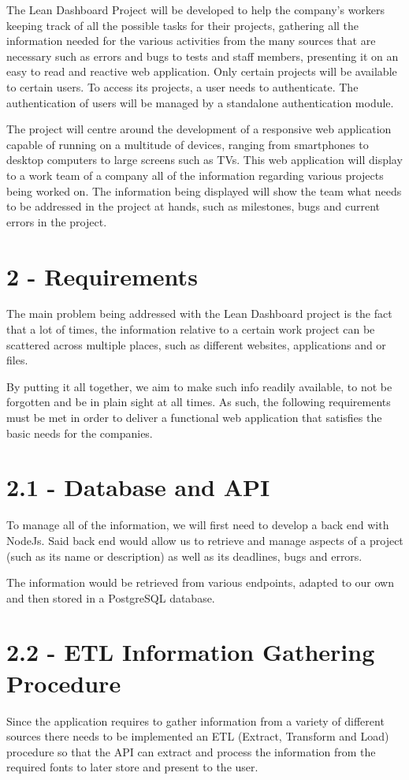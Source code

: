 \documentclass[a4paper,twoside,10pt]{article}
\begin{document}
The Lean Dashboard Project will be developed to help the company’s workers keeping track of all the possible tasks for their projects, gathering all the information needed for the various activities from the many sources that are necessary such as errors and bugs to tests and staff members, presenting it on an easy to read and reactive web application. Only certain projects will be available to certain users. To access its projects, a user needs to authenticate. The authentication of users will be managed by a standalone authentication module.

The project will centre around the development of a responsive web application capable of running on a multitude of devices, ranging from smartphones to desktop computers to large screens such as TVs. This web application will display to a work team of a company all of the information regarding various projects being worked on. 
The information being displayed will show the team what needs to be addressed in the project at hands, such as milestones, bugs and current errors in the project.

\pagebreak
\section*{2 - Requirements}
The main problem being addressed with the Lean Dashboard project is the fact that a lot of times, the information relative to a certain work project can be scattered across multiple places, such as different websites, applications and or files.

By putting it all together, we aim to make such info readily available, to not be forgotten and be in plain sight at all times.
As such, the following requirements must be met in order to deliver a functional web application that satisfies the basic needs for the companies.


\section*{2.1 - Database and API}
To manage all of the information, we will first need to develop a back end with NodeJs. Said back end would allow us to retrieve and manage aspects of a project (such as its name or description) as well as its deadlines, bugs and errors. 

The information would be retrieved from various endpoints, adapted to our own and then stored in a PostgreSQL database.

\section*{2.2 - ETL Information Gathering Procedure}
Since the application requires to gather information from a variety of different sources there needs to be implemented an ETL\cite{ETLPROC} (Extract, Transform and Load) procedure so that the API can extract and process the information from the required fonts to later store and present to the user.
\end{document}
